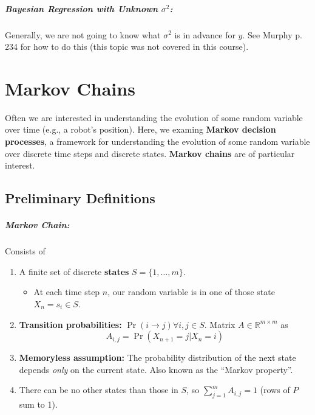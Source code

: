 \documentclass[a4paper,12pt]{report}
\begin{document}
\paragraph{Bayesian Regression with Unknown $\sigma^2$: } Generally, we are not going to know what $\sigma^2$ is in advance for $y$. See Murphy p. 234 for how to do this (this topic was not covered in this course).






\chapter{Markov Chains}

Often we are interested in understanding the evolution of some random variable over time (e.g., a robot's position). Here, we examing \textbf{Markov decision processes}, a framework for understanding the evolution of some random variable over discrete time steps and discrete states. \textbf{Markov chains} are of particular interest.

\section{Preliminary Definitions}

\paragraph{Markov Chain: } Consists of 
\begin{enumerate}
\item A finite set of discrete \textbf{states} $S = \{1, \dots, m\}$.
\begin{itemize}
\item At each time step $n$, our random variable is in one of those state $X_n = s_i \in S$.
\end{itemize}
\item \textbf{Transition probabilities:} $\Pr(i\to j) \forall i,j\in S$. Matrix $A\in \mathbb R^{m\times m}$ as 
\begin{equation}
A_{i,j} = \Pr(X_{n+1} = j | X_n = i)
\end{equation}

\item \textbf{Memoryless assumption:} The probability distribution of the next state depends \textit{only} on the current state. Also known as the ``Markov property''.
\item There can be no other states than those in $S$, so $\sum_{j=1}^{m} A_{i,j} = 1$ (rows of $P$ sum to 1).
\end{enumerate}
\end{document}
